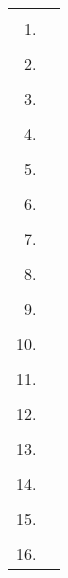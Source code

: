 \begin{tabularx}{\textwidth}{|r X|}
\hline
& \\[-.8em]  1. & \\[.4em] \hline
& \\[-.8em]  2. & \\[.4em] \hline
& \\[-.8em]  3. & \\[.4em] \hline
& \\[-.8em]  4. & \\[.4em] \hline
& \\[-.8em]  5. & \\[.4em] \hline
& \\[-.8em]  6. & \\[.4em] \hline
& \\[-.8em]  7. & \\[.4em] \hline
& \\[-.8em]  8. & \\[.4em] \hline
& \\[-.8em]  9. & \\[.4em] \hline
& \\[-.8em] 10. & \\[.4em] \hline
& \\[-.8em] 11. & \\[.4em] \hline
& \\[-.8em] 12. & \\[.4em] \hline
& \\[-.8em] 13. & \\[.4em] \hline
& \\[-.8em] 14. & \\[.4em] \hline
& \\[-.8em] 15. & \\[.4em] \hline
& \\[-.8em] 16. & \\[.4em] \hline
\end{tabularx}
